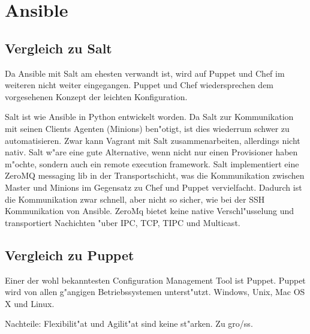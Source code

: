 \section{Ansible}

\subsection{Vergleich zu Salt}
Da Ansible mit Salt am ehesten verwandt ist, wird auf Puppet und Chef im weiteren nicht weiter eingegangen.
Puppet und Chef wiedersprechen dem vorgesehenen Konzept der leichten Konfiguration.

Salt ist wie Ansible in Python entwickelt worden. Da Salt zur Kommunikation mit seinen Clients Agenten (Minions) ben"otigt, ist dies wiederrum schwer zu automatisieren. Zwar kann Vagrant mit Salt zusammenarbeiten, allerdings nicht nativ. Salt w"are eine gute Alternative, wenn nicht nur einen Provisioner haben m"ochte, sondern auch ein remote execution framework.
Salt implementiert eine ZeroMQ messaging lib in der Transportschicht, was die Kommunikation zwischen Master und Minions im Gegensatz zu Chef und Puppet vervielfacht. Dadurch ist die Kommunikation zwar schnell, aber nicht so sicher, wie bei der SSH Kommunikation von Ansible. 
ZeroMq bietet keine native Verschl"usselung und transportiert Nachichten "uber IPC, TCP, TIPC und Multicast.

\subsection{Vergleich zu Puppet}
Einer der wohl bekanntesten Configuration Management Tool ist Puppet.
Puppet wird von allen g"angigen Betriebssystemen unterst"utzt. Windows, Unix, Mac OS X und Linux. 

Nachteile: Flexibilit"at und Agilit"at sind keine st"arken. Zu gro{/ss}. 

